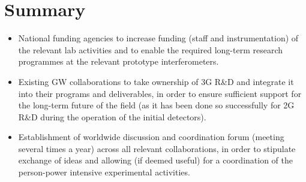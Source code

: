 \chapter{Summary}
\label{sec:Summary}


\begin{itemize}
\item National funding agencies to increase funding (staff and instrumentation) of the relevant lab activities and to enable the required long-term research programmes at the relevant prototype interferometers.
\item Existing GW collaborations to take ownership of 3G R\&D and integrate it into their programs and deliverables, in order to ensure sufficient support for the long-term future of the field (as it has been done so successfully for 2G R\&D during the operation of the initial detectors). 
\item Establishment of worldwide discussion and coordination forum (meeting several times a year) across all relevant collaborations, in order to stipulate exchange of ideas and allowing (if deemed useful) for a coordination of the person-power intensive experimental activities.
\end{itemize}
